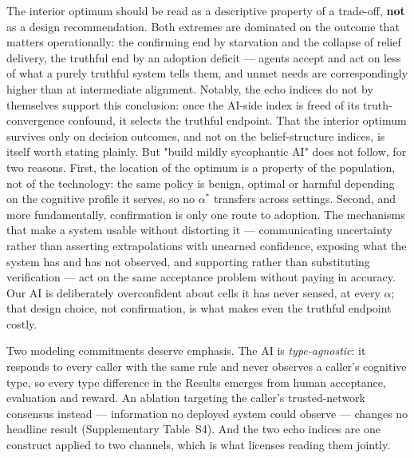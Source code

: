 \documentclass[pdflatex,sn-nature]{sn-jnl}
\begin{document}
The interior optimum should be read as a descriptive property of a trade-off, \textbf{not} as a design recommendation. Both extremes are dominated on the outcome that matters operationally: the confirming end by starvation and the collapse of relief delivery, the truthful end by an adoption deficit --- agents accept and act on less of what a purely truthful system tells them, and unmet needs are correspondingly higher than at intermediate alignment. Notably, the echo indices do not by themselves support this conclusion: once the AI-side index is freed of its truth-convergence confound, it selects the truthful endpoint. That the interior optimum survives only on decision outcomes, and not on the belief-structure indices, is itself worth stating plainly. But "build mildly sycophantic AI" does not follow, for two reasons. First, the location of the optimum is a property of the population, not of the technology: the same policy is benign, optimal or harmful depending on the cognitive profile it serves, so no $\alpha^{*}$ transfers across settings. Second, and more fundamentally, confirmation is only one route to adoption. The mechanisms that make a system usable without distorting it --- communicating uncertainty rather than asserting extrapolations with unearned confidence, exposing what the system has and has not observed, and supporting rather than substituting verification --- act on the same acceptance problem without paying in accuracy. Our AI is deliberately overconfident about cells it has never sensed, at every $\alpha$; that design choice, not confirmation, is what makes even the truthful endpoint costly.

Two modeling commitments deserve emphasis. The AI is \emph{type-agnostic}: it responds to every caller with the same rule and never observes a caller's cognitive type, so every type difference in the Results emerges from human acceptance, evaluation and reward. An ablation targeting the caller's trusted-network consensus instead --- information no deployed system could observe --- changes no headline result (Supplementary Table~S4). And the two echo indices are one construct applied to two channels, which is what licenses reading them jointly.
\end{document}
